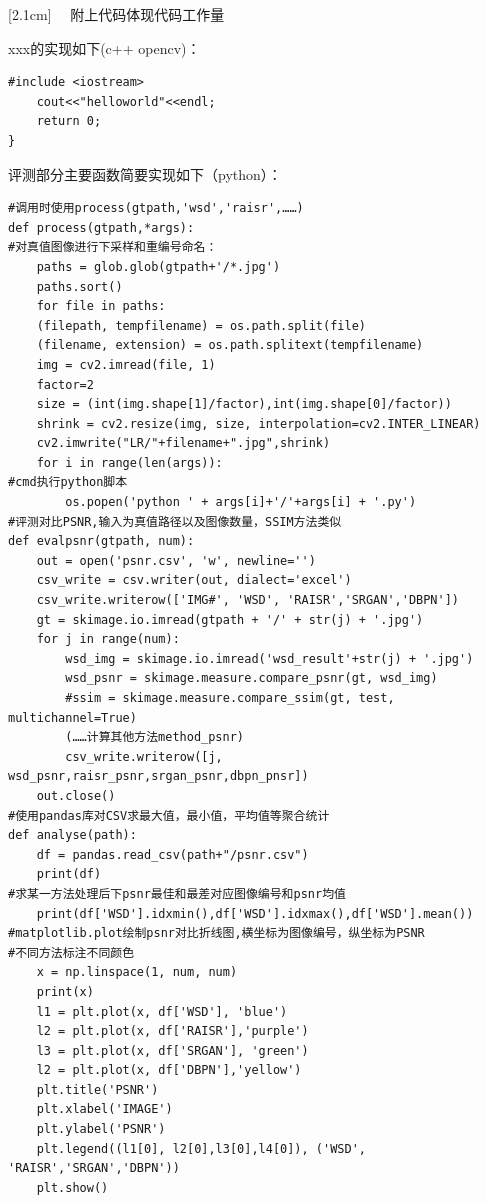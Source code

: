 \documentclass[12pt]{ctexart}
\begin{document}
[2.1cm]{}{\contentslabel{4em}}{\hspace*{-2em}}{~~\contentspage}
附上代码体现代码工作量
xxx的实现如下(c++ opencv)：
\begin{lstlisting}
#include <iostream>
	cout<<"helloworld"<<endl;
	return 0;
}
\end{lstlisting}
评测部分主要函数简要实现如下（python）：
\begin{lstlisting}
#调用时使用process(gtpath,'wsd','raisr',……)
def process(gtpath,*args):
#对真值图像进行下采样和重编号命名：
	paths = glob.glob(gtpath+'/*.jpg')
	paths.sort()
	for file in paths:
	(filepath, tempfilename) = os.path.split(file)
	(filename, extension) = os.path.splitext(tempfilename)
	img = cv2.imread(file, 1)  
	factor=2
	size = (int(img.shape[1]/factor),int(img.shape[0]/factor))  
	shrink = cv2.resize(img, size, interpolation=cv2.INTER_LINEAR)
	cv2.imwrite("LR/"+filename+".jpg",shrink)
	for i in range(len(args)):
#cmd执行python脚本
		os.popen('python ' + args[i]+'/'+args[i] + '.py')
#评测对比PSNR,输入为真值路径以及图像数量，SSIM方法类似
def evalpsnr(gtpath, num):
	out = open('psnr.csv', 'w', newline='')
	csv_write = csv.writer(out, dialect='excel')
	csv_write.writerow(['IMG#', 'WSD', 'RAISR','SRGAN','DBPN'])
	gt = skimage.io.imread(gtpath + '/' + str(j) + '.jpg')
	for j in range(num):
		wsd_img = skimage.io.imread('wsd_result'+str(j) + '.jpg')
		wsd_psnr = skimage.measure.compare_psnr(gt, wsd_img)
		#ssim = skimage.measure.compare_ssim(gt, test, multichannel=True)
		(……计算其他方法method_psnr)
		csv_write.writerow([j, wsd_psnr,raisr_psnr,srgan_psnr,dbpn_pnsr])
	out.close()
#使用pandas库对CSV求最大值，最小值，平均值等聚合统计
def analyse(path):
	df = pandas.read_csv(path+"/psnr.csv")
	print(df)
#求某一方法处理后下psnr最佳和最差对应图像编号和psnr均值
	print(df['WSD'].idxmin(),df['WSD'].idxmax(),df['WSD'].mean())
#matplotlib.plot绘制psnr对比折线图,横坐标为图像编号，纵坐标为PSNR
#不同方法标注不同颜色
	x = np.linspace(1, num, num)
	print(x)
	l1 = plt.plot(x, df['WSD'], 'blue')
	l2 = plt.plot(x, df['RAISR'],'purple')
	l3 = plt.plot(x, df['SRGAN'], 'green')
	l2 = plt.plot(x, df['DBPN'],'yellow')
	plt.title('PSNR')
	plt.xlabel('IMAGE')
	plt.ylabel('PSNR')
	plt.legend((l1[0], l2[0],l3[0],l4[0]), ('WSD', 'RAISR','SRGAN','DBPN'))
	plt.show()
\end{lstlisting}
\end{document}

